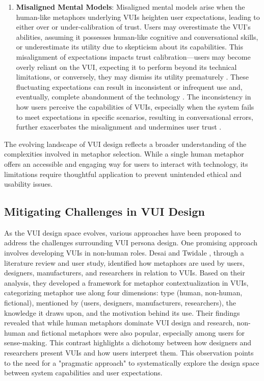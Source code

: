\begin{enumerate}
\item \textbf{Misaligned Mental Models}:  Misaligned mental models arise when the human-like metaphors underlying VUIs heighten user expectations, leading to either over or under-calibration of trust. Users may overestimate the VUI's abilities, assuming it possesses human-like cognitive and conversational skills, or underestimate its utility due to skepticism about its capabilities. \cite{Cowan_Pantidi_Coyle_Morrissey_Clarke_Al-Shehri_Earley_Bandeira_2017} This misalignment of expectations impacts trust calibration—users may become overly reliant on the VUI, expecting it to perform beyond its technical limitations, or conversely, they may dismiss its utility prematurely \cite{Luger_Sellen_2016}. These fluctuating expectations can result in inconsistent or infrequent use \cite{Cowan_Pantidi_Coyle_Morrissey_Clarke_Al-Shehri_Earley_Bandeira_2017} and, eventually, complete abandonment of the technology \cite{Trajkova_Martin-Hammond_2020}. The inconsistency in how users perceive the capabilities of VUIs, especially when the system fails to meet expectations in specific scenarios, resulting in conversational errors, further exacerbates the misalignment and undermines user trust \cite{Baughan_Wang_Liu_Mercurio_Chen_Ma_2023}.

\end{enumerate}

The evolving landscape of VUI design reflects a broader understanding of the complexities involved in metaphor selection. While a single human metaphor offers an accessible and engaging way for users to interact with technology, its limitations require thoughtful application to prevent unintended ethical and usability issues.

\subsection{Mitigating Challenges in VUI Design}
\label{sec:mitigate}

As the VUI design space evolves, various approaches have been proposed to address the challenges surrounding VUI persona design. One promising approach involves developing VUIs in non-human roles. Desai and Twidale \cite{Desai_Twidale_2023}, through a literature review and user study, identified how metaphors are used by users, designers, manufacturers, and researchers in relation to VUIs. Based on their analysis, they developed a framework for metaphor contextualization in VUIs, categorizing metaphor use along four dimensions: type (human, non-human, fictional), mentioned by (users, designers, manufacturers, researchers), the knowledge it draws upon, and the motivation behind its use. Their findings revealed that while human metaphors dominate VUI design and research, non-human and fictional metaphors were also popular, especially among users for sense-making. This contrast highlights a dichotomy between how designers and researchers present VUIs and how users interpret them. This observation points to the need for a "pragmatic approach" \cite{Carroll_Mack_Kellogg_1988} to systematically explore the design space between system capabilities and user expectations.

